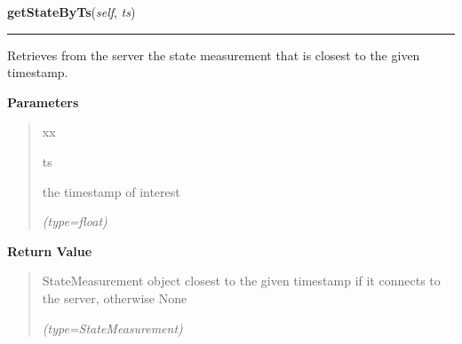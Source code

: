 \hspace{.8\funcindent}\begin{boxedminipage}{\funcwidth}

    \raggedright \textbf{getStateByTs}(\textit{self}, \textit{ts})

    \vspace{-1.5ex}

    \rule{\textwidth}{0.5\fboxrule}
\setlength{\parskip}{2ex}
    Retrieves from the server the state measurement that is closest to the 
    given timestamp.

\setlength{\parskip}{1ex}
      \textbf{Parameters}
      \vspace{-1ex}

      \begin{quote}
        \begin{Ventry}{xx}

          \item[ts]

          the timestamp of interest

            {\it (type=float)}

        \end{Ventry}

      \end{quote}

      \textbf{Return Value}
    \vspace{-1ex}

      \begin{quote}
      StateMeasurement object closest to the given timestamp if it connects
      to the server, otherwise None

      {\it (type=StateMeasurement)}

      \end{quote}

    \end{boxedminipage}

    \label{client_rest:ImagingInterface:getStateById}

    \vspace{0.5ex}

